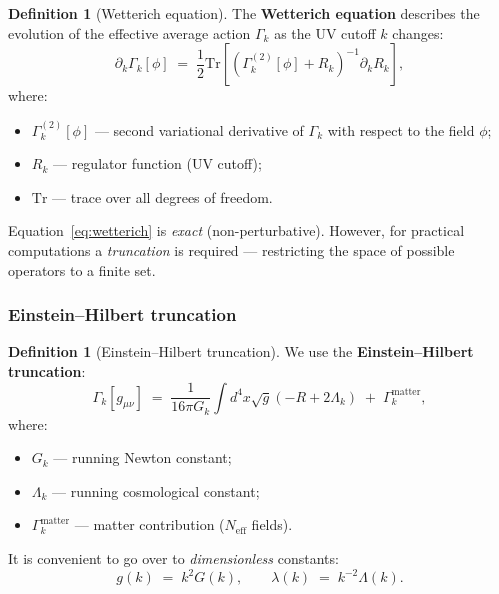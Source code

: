 \documentclass[11pt,a4paper]{article}
\theoremstyle{definition}
\newtheorem{definition}[theorem]{Definition}
\begin{document}
\begin{definition}[Wetterich equation]
\label{def:wetterich}
The \textbf{Wetterich equation} describes the evolution of the effective
average action $\Gamma_k$ as the UV cutoff $k$ changes:
\begin{equation}
    \partial_k \Gamma_k[\phi]
    \;=\; \frac{1}{2} \mathrm{Tr}\left[
    \left(\Gamma_k^{(2)}[\phi] + R_k\right)^{-1} \partial_k R_k
    \right],
    \label{eq:wetterich}
\end{equation}
where:
\begin{itemize}
    \item $\Gamma_k^{(2)}[\phi]$ --- second variational derivative
          of $\Gamma_k$ with respect to the field $\phi$;
    \item $R_k$ --- regulator function (UV cutoff);
    \item $\mathrm{Tr}$ --- trace over all degrees of freedom.
\end{itemize}
\end{definition}

\medskip\noindent
Equation~\eqref{eq:wetterich} is \emph{exact}
(non-perturbative). However, for practical computations
a \emph{truncation} is required --- restricting the space
of possible operators to a finite set.

\subsubsection{Einstein--Hilbert truncation}

\begin{definition}[Einstein--Hilbert truncation]
\label{def:eh-truncation}
We use the \textbf{Einstein--Hilbert truncation}:
\begin{equation}
    \Gamma_k[g_{\mu\nu}]
    \;=\; \frac{1}{16\pi G_k} \int d^4 x \sqrt{g}
    \left(-R + 2\Lambda_k\right)
    \;+\; \Gamma_k^{\text{matter}},
    \label{eq:eh-truncation}
\end{equation}
where:
\begin{itemize}
    \item $G_k$ --- running Newton constant;
    \item $\Lambda_k$ --- running cosmological constant;
    \item $\Gamma_k^{\text{matter}}$ --- matter contribution
          ($N_{\text{eff}}$ fields).
\end{itemize}
\end{definition}

\medskip\noindent
It is convenient to go over to \emph{dimensionless} constants:
\begin{equation}
    g(k) \;=\; k^2 G(k), \qquad
    \lambda(k) \;=\; k^{-2} \Lambda(k).
    \label{eq:dimensionless}
\end{equation}
\end{document}
